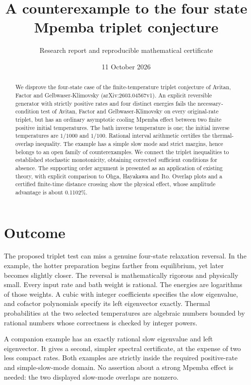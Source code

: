\documentclass[11pt]{article}
\title{A counterexample to the four state Mpemba triplet conjecture}
\author{Research report and reproducible mathematical certificate}
\date{11 October 2026}
\begin{document}
\maketitle
\begin{abstract}
We disprove the four-state case of the finite-temperature triplet conjecture of Avitan, Factor and Gelbwaser-Klimovsky (arXiv:2603.04567v1). An explicit reversible generator with strictly positive rates and four distinct energies fails the necessary-condition test of Avitan, Factor and Gelbwaser-Klimovsky on every original-rate triplet, but has an ordinary asymptotic cooling Mpemba effect between two finite positive initial temperatures. The bath inverse temperature is one; the initial inverse temperatures are $1/1000$ and $1/100$. Rational interval arithmetic certifies the thermal-overlap inequality. The example has a simple slow mode and strict margins, hence belongs to an open family of counterexamples. We connect the triplet inequalities to established stochastic monotonicity, obtaining corrected sufficient conditions for absence. The supporting order argument is presented as an application of existing theory, with explicit comparison to Ohga, Hayakawa and Ito. Overlap plots and a certified finite-time distance crossing show the physical effect, whose amplitude advantage is about 0.1102\%.
\end{abstract}

\section{Outcome}
The proposed triplet test can miss a genuine four-state relaxation reversal. In the example, the hotter preparation begins farther from equilibrium, yet later becomes slightly closer. The reversal is mathematically rigorous and physically small. Every input rate and bath weight is rational. The energies are logarithms of those weights. A cubic with integer coefficients specifies the slow eigenvalue, and cofactor polynomials specify its left eigenvector exactly. Thermal probabilities at the two selected temperatures are algebraic numbers bounded by rational numbers whose correctness is checked by integer powers.

A companion example has an exactly rational slow eigenvalue and left eigenvector. It gives a second, simpler spectral certificate, at the expense of two less compact rates. Both examples are strictly inside the required positive-rate and simple-slow-mode domain. No assertion about a strong Mpemba effect is needed: the two displayed slow-mode overlaps are nonzero.
\end{document}
